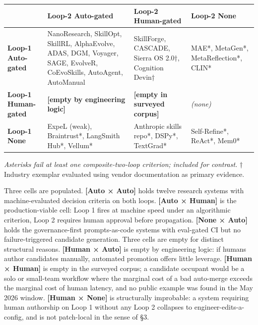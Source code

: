 {\def\LTcaptype{none} %
\begin{longtable}[]{@{}
  >{\raggedright\arraybackslash}p{}
  >{\raggedright\arraybackslash}p{}
  >{\raggedright\arraybackslash}p{}
  >{\raggedright\arraybackslash}p{}@{}}
\toprule\noalign{}
\begin{minipage}[b]{\linewidth}\raggedright
\end{minipage} & \begin{minipage}[b]{\linewidth}\raggedright
\textbf{Loop-2 Auto-gated}
\end{minipage} & \begin{minipage}[b]{\linewidth}\raggedright
\textbf{Loop-2 Human-gated}
\end{minipage} & \begin{minipage}[b]{\linewidth}\raggedright
\textbf{Loop-2 None}
\end{minipage} \\
\midrule\noalign{}
\endhead
\bottomrule\noalign{}
\endlastfoot
\textbf{Loop-1 Auto-gated} & NanoResearch, SkillOpt, SkillRL,
AlphaEvolve, ADAS, DGM, Voyager, SAGE, EvolveR, CoEvoSkills, AutoAgent,
AutoManual & SkillForge, CASCADE, Sierra OS 2.0†, Cognition Devin† &
MAE*, MetaGen*, MetaReflection*, CLIN* \\
\textbf{Loop-1 Human-gated} & \textbf{{[}empty by engineering logic{]}}
& \textbf{{[}empty in surveyed corpus{]}} & \emph{(none)} \\
\textbf{Loop-1 None} & ExpeL (weak), Braintrust*, LangSmith Hub*,
Vellum* & Anthropic skills repo*, DSPy*, TextGrad* & Self-Refine*,
ReAct*, Mem0* \\
\end{longtable}
}

\emph{Asterisks fail at least one composite-two-loop criterion; included
for contrast.} † Industry exemplar evaluated using vendor documentation
as primary evidence.

Three cells are populated. \textbf{{[}Auto × Auto{]}} holds twelve
research systems with machine-evaluated decision criteria on both loops.
\textbf{{[}Auto × Human{]}} is the production-viable cell: Loop 1 fires
at machine speed under an algorithmic criterion, Loop 2 requires human
approval before propagation. \textbf{{[}None × Auto{]}} holds the
governance-first prompts-as-code systems with eval-gated CI but no
failure-triggered candidate generation. Three cells are empty for
distinct structural reasons. \textbf{{[}Human × Auto{]}} is empty by
engineering logic: if humans author candidates manually, automated
promotion offers little leverage. \textbf{{[}Human × Human{]}} is empty
in the surveyed corpus; a candidate occupant would be a solo or
small-team workflow where the marginal cost of a bad auto-merge exceeds
the marginal cost of human latency, and no public example was found in
the May 2026 window. \textbf{{[}Human × None{]}} is structurally
improbable: a system requiring human authorship on Loop 1 without any
Loop 2 collapses to engineer-edits-a-config, and is not patch-local in
the sense of §3.

